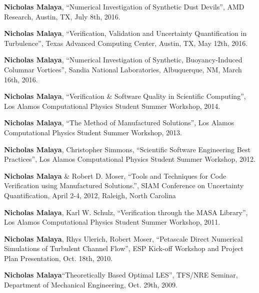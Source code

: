 
\textbf{Nicholas Malaya}, ``Numerical Investigation of Synthetic Dust Devils'', AMD Research, 
		 Austin, TX, July 8th, 2016. 

\blankline

\textbf{Nicholas Malaya}, ``Verification, Validation and Uncertainty Quantification in Turbulence'', Texas Advanced Computing Center, 
		 Austin, TX, May 12th, 2016. 

\blankline

\textbf{Nicholas Malaya}, ``Numerical Investigation of Synthetic, Buoyancy-Induced Columnar Vortices'', Sandia National Laboratories, 
		 Albuquerque, NM, March 16th, 2016. 

\blankline

\textbf{Nicholas Malaya}, ``Verification \& Software Quality in Scientific
      Computing'', Los Alamos Computational Physics Student Summer
      Workshop, 2014. 

\blankline

\textbf{Nicholas Malaya}, ``The Method of Manufactured Solutions'', Los Alamos
      Computational Physics Student Summer Workshop, 2013.

\blankline

\textbf{Nicholas Malaya}, Christopher Simmons, ``Scientific Software Engineering
      Best Practices'', Los Alamos Computational Physics Student Summer
      Workshop, 2012.

\blankline

\textbf{Nicholas Malaya} \& Robert D. Moser, ``Tools and Techniques for Code
Verification using Manufactured Solutions.'', SIAM Conference on
Uncertainty Quantification, April 2-4, 2012, Raleigh, North Carolina 

\blankline

\textbf{Nicholas Malaya}, Karl W. Schulz, ``Verification through the MASA
      Library'', Los Alamos Computational Physics Student Summer
      Workshop, 2011.

\blankline

\textbf{Nicholas Malaya}, Rhys Ulerich, Robert Moser, ``Petascale Direct
Numerical Simulations of Turbulent Channel Flow'', ESP Kick-off
Workshop and Project Plan Presentation, Oct. 18th, 2010.

\blankline

\textbf{Nicholas Malaya}``Theoretically Based Optimal LES'', TFS/NRE
Seminar, Department of Mechanical Engineering, Oct. 29th, 2009. 


